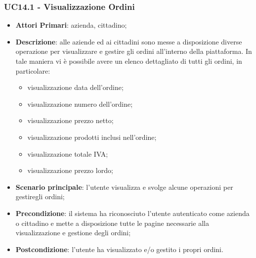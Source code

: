 \subsubsection{UC14.1 - Visualizzazione Ordini}
\begin{itemize}
	\item \textbf{Attori Primari}: azienda, cittadino;
	\item \textbf{Descrizione}: alle aziende ed ai cittadini sono messe a disposizione diverse operazione per visualizzare e gestire gli ordini all'interno della piattaforma. In tale maniera vi è possibile avere un elenco dettagliato di tutti gli ordini, in particolare:
	\begin{itemize}
		\item visualizzazione data dell'ordine;
		\item visualizzazione numero dell'ordine;
		\item visualizzazione prezzo netto;
		\item visualizzazione prodotti inclusi nell'ordine;
		\item visualizzazione totale IVA;
		\item visualizzazione prezzo lordo;
	\end{itemize}
	\item \textbf{Scenario principale}: l'utente visualizza e svolge alcune operazioni per gestiregli ordini;
	\item \textbf{Precondizione}: il sistema ha riconosciuto l'utente autenticato come azienda o cittadino e mette a disposizione tutte le pagine necessarie alla visualizzazione e gestione degli ordini;
	\item \textbf{Postcondizione}: l'utente ha visualizzato e/o gestito i propri ordini.
\end{itemize} 

